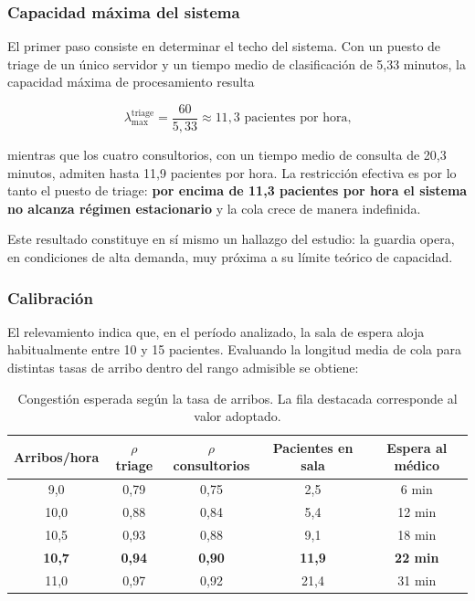 \documentclass{article}
\begin{document}
\subsubsection*{Capacidad máxima del sistema}

El primer paso consiste en determinar el techo del sistema. Con un puesto de
triage de un único servidor y un tiempo medio de clasificación de 5,33
minutos, la capacidad máxima de procesamiento resulta

\[
\lambda_{\max}^{\text{triage}} = \frac{60}{5{,}33} \approx 11{,}3
\text{ pacientes por hora,}
\]

mientras que los cuatro consultorios, con un tiempo medio de consulta de 20,3
minutos, admiten hasta 11,9 pacientes por hora. La restricción efectiva es por
lo tanto el puesto de triage: \textbf{por encima de 11,3 pacientes por hora el
sistema no alcanza régimen estacionario} y la cola crece de manera indefinida.

Este resultado constituye en sí mismo un hallazgo del estudio: la guardia
opera, en condiciones de alta demanda, muy próxima a su límite teórico de
capacidad.

\subsubsection*{Calibración}

El relevamiento indica que, en el período analizado, la sala de espera aloja
habitualmente entre 10 y 15 pacientes. Evaluando la longitud media de cola
para distintas tasas de arribo dentro del rango admisible se obtiene:

\begin{table}[H]
\centering
\begin{tabular}{ccccc}
\toprule
\textbf{Arribos/hora} & \textbf{$\rho$ triage} & \textbf{$\rho$ consultorios}
& \textbf{Pacientes en sala} & \textbf{Espera al médico} \\
\midrule
9{,}0  & 0,79 & 0,75 & 2,5  & 6 min \\
10{,}0 & 0,88 & 0,84 & 5,4  & 12 min \\
10{,}5 & 0,93 & 0,88 & 9,1  & 18 min \\
\textbf{10{,}7} & \textbf{0,94} & \textbf{0,90} & \textbf{11,9} & \textbf{22 min} \\
11{,}0 & 0,97 & 0,92 & 21,4 & 31 min \\
\bottomrule
\end{tabular}
\caption{Congestión esperada según la tasa de arribos. La fila destacada
corresponde al valor adoptado.}
\label{tab:calibracion}
\end{table}
\end{document}
